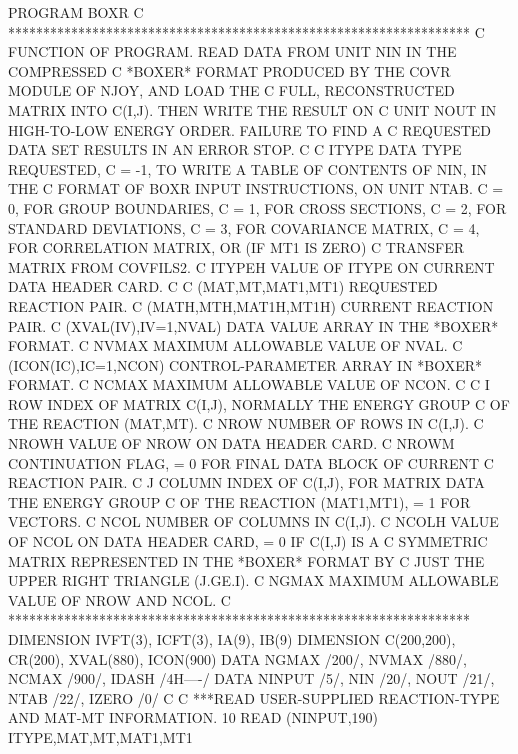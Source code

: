 \small
\begin {ccode}

      PROGRAM BOXR
C     ******************************************************************
C     FUNCTION OF PROGRAM.  READ DATA FROM UNIT NIN IN THE COMPRESSED
C     *BOXER* FORMAT PRODUCED BY THE COVR MODULE OF NJOY, AND LOAD THE
C     FULL, RECONSTRUCTED MATRIX INTO C(I,J).  THEN WRITE THE RESULT ON
C     UNIT NOUT IN HIGH-TO-LOW ENERGY ORDER.  FAILURE TO FIND A
C     REQUESTED DATA SET RESULTS IN AN ERROR STOP.
C
C       ITYPE   DATA TYPE REQUESTED,
C                 = -1, TO WRITE A TABLE OF CONTENTS OF NIN, IN THE
C                   FORMAT OF BOXR INPUT INSTRUCTIONS, ON UNIT NTAB.
C                 = 0, FOR GROUP BOUNDARIES,
C                 = 1, FOR CROSS SECTIONS,
C                 = 2, FOR STANDARD DEVIATIONS,
C                 = 3, FOR COVARIANCE MATRIX,
C                 = 4, FOR CORRELATION MATRIX, OR (IF MT1 IS ZERO)
C                   TRANSFER MATRIX FROM COVFILS2.
C       ITYPEH  VALUE OF ITYPE ON CURRENT DATA HEADER CARD.
C
C      (MAT,MT,MAT1,MT1)     REQUESTED REACTION PAIR.
C      (MATH,MTH,MAT1H,MT1H) CURRENT REACTION PAIR.
C      (XVAL(IV),IV=1,NVAL)  DATA VALUE ARRAY IN THE *BOXER* FORMAT.
C       NVMAX                MAXIMUM ALLOWABLE VALUE OF NVAL.
C      (ICON(IC),IC=1,NCON)  CONTROL-PARAMETER ARRAY IN *BOXER* FORMAT.
C       NCMAX                MAXIMUM ALLOWABLE VALUE OF NCON.
C
C       I       ROW INDEX OF MATRIX C(I,J), NORMALLY THE ENERGY GROUP
C                 OF THE REACTION (MAT,MT).
C       NROW    NUMBER OF ROWS IN C(I,J).
C       NROWH   VALUE OF NROW ON DATA HEADER CARD.
C       NROWM   CONTINUATION FLAG, = 0 FOR FINAL DATA BLOCK OF CURRENT
C                 REACTION PAIR.
C       J       COLUMN INDEX OF C(I,J), FOR MATRIX DATA THE ENERGY GROUP
C                 OF THE REACTION (MAT1,MT1), = 1 FOR VECTORS.
C       NCOL    NUMBER OF COLUMNS IN C(I,J).
C       NCOLH   VALUE OF NCOL ON DATA HEADER CARD, = 0 IF C(I,J) IS A
C                 SYMMETRIC MATRIX REPRESENTED IN THE *BOXER* FORMAT BY
C                 JUST THE UPPER RIGHT TRIANGLE (J.GE.I).
C       NGMAX   MAXIMUM ALLOWABLE VALUE OF NROW AND NCOL.
C     ******************************************************************
      DIMENSION IVFT(3), ICFT(3), IA(9), IB(9)
      DIMENSION C(200,200), CR(200), XVAL(880), ICON(900)
      DATA NGMAX /200/, NVMAX /880/, NCMAX /900/, IDASH /4H----/
      DATA NINPUT /5/, NIN /20/, NOUT /21/, NTAB /22/, IZERO /0/
C
C     ***READ USER-SUPPLIED REACTION-TYPE AND MAT-MT INFORMATION.
   10 READ (NINPUT,190) ITYPE,MAT,MT,MAT1,MT1

\end{ccode}

